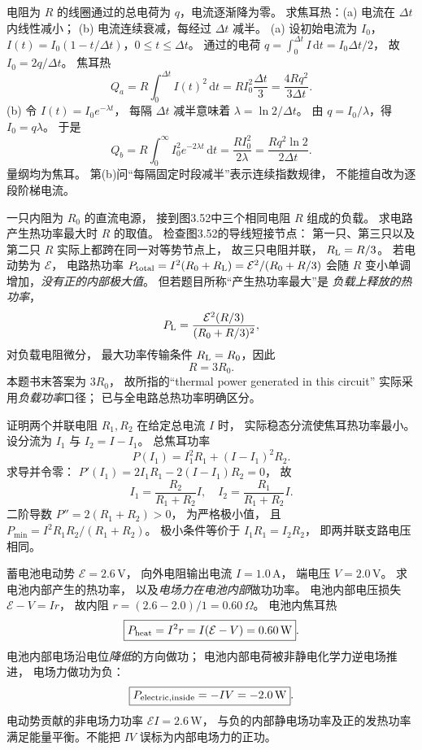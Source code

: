 电阻为 $R$ 的线圈通过的总电荷为 $q$，电流逐渐降为零。
求焦耳热：(a) 电流在 $\Delta t$ 内线性减小；
(b) 电流连续衰减，每经过 $\Delta t$ 减半。
\exsolution
(a) 设初始电流为 $I_0$，
$I(t)=I_0(1-t/\Delta t)$，$0\le t\le\Delta t$。
通过的电荷
$q=\int_0^{\Delta t}I\,\mathrm dt=I_0\Delta t/2$，
故 $I_0=2q/\Delta t$。
焦耳热
\[
Q_a=R\int_0^{\Delta t}I(t)^2\,\mathrm dt
=RI_0^2\frac{\Delta t}{3}
=\boxed{\frac{4Rq^2}{3\Delta t}}.
\]
(b) 令
$I(t)=I_0e^{-\lambda t}$，
每隔 $\Delta t$ 减半意味着
$\lambda=\ln2/\Delta t$。
由 $q=I_0/\lambda$，得 $I_0=q\lambda$。
于是
\[
Q_b=R\int_0^\infty I_0^2e^{-2\lambda t}\,\mathrm dt
=\frac{RI_0^2}{2\lambda}
=\boxed{\frac{Rq^2\ln2}{2\Delta t}}.
\]
\excheck 量纲均为焦耳。
第(b)问“每隔固定时段减半”表示连续指数规律，
不能擅自改为逐段阶梯电流。

一只内阻为 $R_0$ 的直流电源，
接到图3.52中三个相同电阻 $R$ 组成的负载。
求电路产生热功率最大时 $R$ 的取值。
\exsolution
检查图3.52的导线短接节点：
第一只、第三只以及第二只 $R$
实际上都跨在同一对等势节点上，
故三只电阻并联，
$R_{\rm L}=R/3$。
若电动势为 $\mathcal E$，
电路热功率
$P_{\rm total}=I^2(R_0+R_{\rm L})
=\mathcal E^2/(R_0+R/3)$
会随 $R$ 变小单调增加，\emph{没有正的内部极大值}。
但若题目所称“产生热功率最大”是
\emph{负载上释放的热功率}，
\[
P_{\rm L}=\frac{\mathcal E^2(R/3)}
{(R_0+R/3)^2},
\]
对负载电阻微分，
最大功率传输条件
$R_{\rm L}=R_0$，因此
\[
\boxed{R=3R_0}.
\]
\excheck 本题书末答案为 $3R_0$，
故所指的“thermal power generated in this circuit”
实际采用\emph{负载功率}口径；
已与全电路总热功率明确区分。

证明两个并联电阻 $R_1,R_2$
在给定总电流 $I$ 时，
实际稳态分流使焦耳热功率最小。
\exsolution
设分流为 $I_1$ 与 $I_2=I-I_1$。
总焦耳功率
\[
P(I_1)=I_1^2R_1+(I-I_1)^2R_2.
\]
求导并令零：
$P'(I_1)=2I_1R_1-2(I-I_1)R_2=0$，
故
\[
\boxed{I_1=\frac{R_2}{R_1+R_2}I,\quad
I_2=\frac{R_1}{R_1+R_2}I}.
\]
二阶导数
$P''=2(R_1+R_2)>0$，
为严格极小值，
且
$P_{\min}=I^2R_1R_2/(R_1+R_2)$。
\excheck 极小条件等价于
$I_1R_1=I_2R_2$，
即两并联支路电压相同。

蓄电池电动势 $\mathcal E=2.6\,\mathrm V$，
向外电阻输出电流 $I=1.0\,\mathrm A$，
端电压 $V=2.0\,\mathrm V$。
求电池内部产生的热功率，
以及\emph{电场力在电池内部}做功功率。
\exsolution
电池内部电压损失
$\mathcal E-V=Ir$，
故内阻 $r=(2.6-2.0)/1=0.60\,\Omega$。
电池内焦耳热
\[
\boxed{P_{\rm heat}=I^2r=I(\mathcal E-V)
=0.60\,\mathrm W}.
\]
电池内部电场沿电位\emph{降低}的方向做功；
电池内部电荷被非静电化学力逆电场推进，
电场力做功为负：
\[
\boxed{P_{\rm electric,inside}=-IV=-2.0\,\mathrm W}.
\]
\excheck 电动势贡献的非电场力功率
$\mathcal EI=2.6\,\mathrm W$，
与负的内部静电场功率及正的发热功率
满足能量平衡。不能把 $IV$ 误标为内部电场力的正功。

